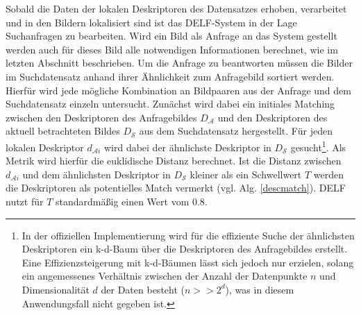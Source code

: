 Sobald die Daten der lokalen Deskriptoren des Datensatzes erhoben, verarbeitet und in den Bildern lokalisiert sind ist das DELF-System in der Lage Suchanfragen zu bearbeiten. Wird ein Bild als Anfrage an das System gestellt werden auch für dieses Bild alle notwendigen Informationen berechnet, wie im letzten Abschnitt beschrieben. Um die Anfrage zu beantworten müssen die Bilder im Suchdatensatz anhand ihrer Ähnlichkeit zum Anfragebild sortiert werden. Hierfür wird jede mögliche Kombination an Bildpaaren aus der Anfrage und dem Suchdatensatz einzeln untersucht. Zunächst wird dabei ein initiales Matching zwischen den Deskriptoren des Anfragebildes $D_\mathcal{A}$ und den Deskriptoren des aktuell betrachteten Bildes $D_\mathcal{S}$ aus dem Suchdatensatz hergestellt. Für jeden lokalen Deskriptor $d_{\mathcal{A}i}$ wird dabei der ähnlichste Deskriptor in $D_\mathcal{S}$ gesucht\footnote{In der offiziellen Implementierung wird für die effiziente Suche der ähnlichsten Deskriptoren ein k-d-Baum \cite{kd_tree} über die Deskriptoren des Anfragebildes erstellt. Eine Effizienzsteigerung mit k-d-Bäumen lässt sich jedoch nur erzielen, solang ein angemessenes Verhältnis zwischen der Anzahl der Datenpunkte $n$ und Dimensionalität $d$ der Daten besteht ($n >> 2^d$)\cite{curse_of_dim}, was in diesem Anwendungsfall nicht gegeben ist.}. Als Metrik wird hierfür die euklidische Distanz berechnet. Ist die Distanz zwischen $d_{\mathcal{A}i}$ und dem ähnlichsten Deskriptor in $D_\mathcal{S}$ kleiner als ein Schwellwert $T$ werden die Deskriptoren als potentielles Match vermerkt (vgl. Alg. \ref{descmatch}).
DELF nutzt für $T$ standardmäßig einen Wert vom $0.8$.

